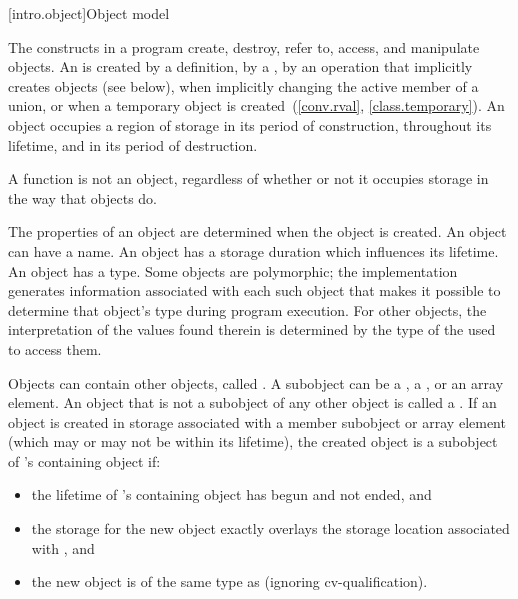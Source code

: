 [intro.object]{Object model}

\pnum
{}%
The constructs in a \Cpp{} program create, destroy, refer to, access, and
manipulate objects.
An  is created
by a definition,
by a ,
by an operation that implicitly creates objects (see below),
when implicitly changing the active member of a union,
or
when a temporary object is created~(\ref{conv.rval}, \ref{class.temporary}).
An object occupies a region of storage
in its period of construction,
throughout its lifetime,
and
in its period of destruction.
\begin{note}
A function is not an object, regardless of whether or not it
occupies storage in the way that objects do.
\end{note}
The properties of an
object are determined when the object is created. An object can have a
name. An object has a storage
duration which influences its
lifetime. An object has a
type.
Some objects are
polymorphic; the implementation
generates information associated with each such object that makes it
possible to determine that object's type during program execution. For
other objects, the interpretation of the values found therein is
determined by the type of the 
used to access them.

\pnum
{}%
Objects can contain other objects, called .
A subobject can be
a , a ,
or an array element.
%
An object that is not a subobject of any other object is called a .
If an object is created
in storage associated with a member subobject or array element 
(which may or may not be within its lifetime),
the created object
is a subobject of 's containing object if:
\begin{itemize}
\item
the lifetime of 's containing object has begun and not ended, and
\item
the storage for the new object exactly overlays the storage location associated with , and
\item
the new object is of the same type as  (ignoring cv-qualification).
\end{itemize}

